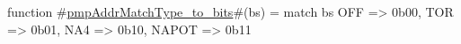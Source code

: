 function #\hyperref[sailRISCVzpmpAddrMatchTypezytozybits]{pmpAddrMatchType\_to\_bits}#(bs) = {
  match bs {
    OFF   => 0b00,
    TOR   => 0b01,
    NA4   => 0b10,
    NAPOT => 0b11
  }
}
